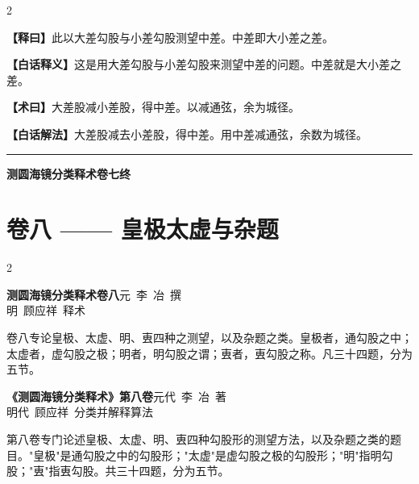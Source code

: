\documentclass[11pt,a4paper]{article}
\newcommand{\WenExplain}{\textcolor{classicalcolor}{\textbf{【释曰】}}}
\newcommand{\BaiExplain}{\textcolor{moderncolor}{\textbf{【白话释义】}}}
\newcommand{\WenMethod}{\textcolor{classicalcolor}{\textbf{【术曰】}}}
\newcommand{\BaiMethod}{\textcolor{moderncolor}{\textbf{【白话解法】}}}
\begin{document}
\begin{paracol}{2}
\switchcolumn*
\begin{tcolorbox}[colback=red!5,colframe=red!30!black,boxrule=0.3pt]
\WenExplain\quad 此以大差勾股与小差勾股测望中差。中差即大小差之差。
\end{tcolorbox}
\switchcolumn
\begin{tcolorbox}[colback=blue!5,colframe=blue!30!black,boxrule=0.3pt]
\BaiExplain\quad 这是用大差勾股与小差勾股来测望中差的问题。中差就是大小差之差。
\end{tcolorbox}

\switchcolumn*
\begin{tcolorbox}[colback=red!5,colframe=red!40!black,boxrule=0.3pt]
\WenMethod\quad 大差股减小差股，得中差。以减通弦，余为城径。
\end{tcolorbox}
\switchcolumn
\begin{tcolorbox}[colback=blue!5,colframe=blue!40!black,boxrule=0.3pt]
\BaiMethod\quad 大差股减去小差股，得中差。用中差减通弦，余数为城径。
\end{tcolorbox}

\end{paracol}

\vspace{1em}
\begin{center}
\rule{0.5\textwidth}{0.4pt}

\textbf{\textcolor{volumecolor}{测圆海镜分类释术卷七终}}
\end{center}



\newpage
\section*{\textcolor{volumecolor}{卷八} —— 皇极太虚与杂题}

\begin{paracol}{2}

\switchcolumn*
\begin{center}
\noindent\textbf{测圆海镜分类释术卷八}\quad 元~李~冶~撰\\
明~顾应祥~释术
\end{center}

\vspace{0.5em}
\noindent
卷八专论皇极、太虚、明、叀四种之测望，以及杂题之类。皇极者，通勾股之中；太虚者，虚勾股之极；明者，明勾股之谓；叀者，叀勾股之称。凡三十四题，分为五节。

\switchcolumn
\begin{center}
\noindent\textbf{《测圆海镜分类释术》第八卷}\quad 元代~李~冶~著\\
明代~顾应祥~分类并解释算法
\end{center}

\vspace{0.5em}
\noindent
第八卷专门论述皇极、太虚、明、叀四种勾股形的测望方法，以及杂题之类的题目。"皇极"是通勾股之中的勾股形；"太虚"是虚勾股之极的勾股形；"明"指明勾股；"叀"指叀勾股。共三十四题，分为五节。

\end{paracol}
\end{document}
